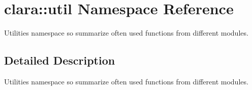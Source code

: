 \hypertarget{namespaceclara_1_1util}{}\section{clara\+:\+:util Namespace Reference}
\label{namespaceclara_1_1util}


Utilities namespace so summarize often used functions from different modules.  




\subsection{Detailed Description}
Utilities namespace so summarize often used functions from different modules. 

